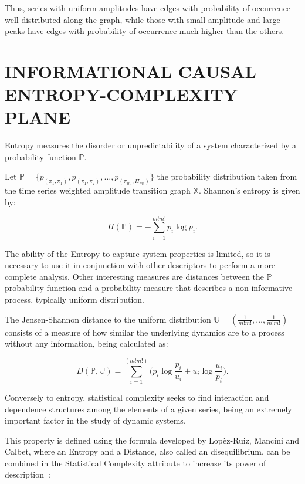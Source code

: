 \documentclass{isprs}
\begin{document}
Thus, series with uniform amplitudes have edges with probability of occurrence well distributed along the graph, while those with small amplitude and large peaks have edges with probability of occurrence much higher than the others.
	
\section{INFORMATIONAL CAUSAL ENTROPY-COMPLEXITY PLANE}\label{HC}
	
Entropy measures the disorder or unpredictability of a system characterized by a probability function $\mathbb{P}$.
	
Let $\mathbb{P} = \{p_{(\pi_1, \pi_1)}, p_{(\pi_1, \pi_2)}, \dots, p_{(\pi_{m!}, \Pi_{m!})} \}$  the probability distribution taken from the time series weighted amplitude transition graph $\mathbb{X}$.
Shannon's entropy is given by:	

\begin{equation}
	H(\mathbb{P}) = -\sum_{i=1}^{m!m!} p_i \log p_i .
	\label{eq:Entropia}
\end{equation}
	
The ability of the Entropy to capture system properties is limited, so it is necessary to use it in conjunction with other descriptors to perform a more complete analysis.
Other interesting measures are distances between the $\mathbb{P}$ probability function and a probability measure that describes a non-informative process, typically uniform distribution.
	
The Jensen-Shannon distance to the uniform distribution $\mathbb{U} = (\frac{1}{m!m!}, \dots, \frac{1}{m!m!})$ consists of a measure of how similar the underlying dynamics are to a process without any information, being calculated as:

\begin{equation}
	D(\mathbb{P}, \mathbb{U}) = \sum_{i=1}^{(m!m!)} \Big(p_i \log\frac{p_i}{u_i} +
	u_i \log\frac{u_i}{p_i}
	\Big).
\end{equation}
	
Conversely to entropy, statistical complexity seeks to find interaction and dependence structures among the elements of a given series, being an extremely important factor in the study of dynamic systems.
	
This property is defined using the formula developed by Lopèz-Ruiz, Mancini and Calbet, where an Entropy and a Distance, also called an disequilibrium, can be combined in the Statistical Complexity attribute to increase its power of description~\citep{Feldman2008information,Feldman1998Statistical,Lopez1995statistical}:
\end{document}
